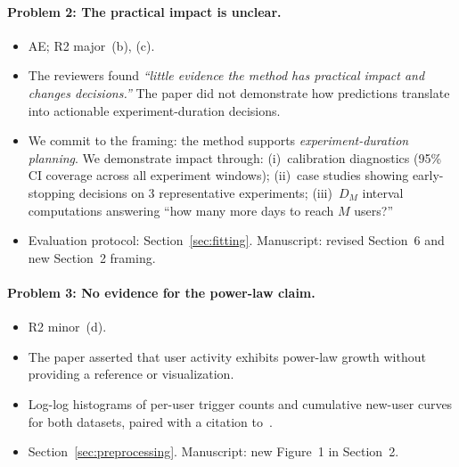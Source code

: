 \paragraph{Problem 2: The practical impact is unclear.}
\begin{itemize}[leftmargin=*]
  \item[\emph{Source:}] AE; R2 major~(b), (c).
  \item[\emph{Problem:}]
        The reviewers found \emph{``little evidence the method has
        practical impact and changes decisions.''}
        The paper did not demonstrate how predictions translate into
        actionable experiment-duration decisions.
  \item[\emph{Solution:}]
        We commit to the framing: the method supports
        \emph{experiment-duration planning}.
        We demonstrate impact through:
        (i)~calibration diagnostics (95\% CI coverage across all
        experiment windows);
        (ii)~case studies showing early-stopping decisions on 3
        representative experiments;
        (iii)~$D_M$ interval computations answering ``how many more
        days to reach $M$ users?''
  \item[\emph{Where:}]
        Evaluation protocol: Section~\ref{sec:fitting}.
        Manuscript: revised Section~6 and new Section~2 framing.
\end{itemize}

\paragraph{Problem 3: No evidence for the power-law claim.}
\begin{itemize}[leftmargin=*]
  \item[\emph{Source:}] R2 minor~(d).
  \item[\emph{Problem:}]
        The paper asserted that user activity exhibits power-law
        growth without providing a reference or visualization.
  \item[\emph{Solution:}]
        Log-log histograms of per-user trigger counts and cumulative
        new-user curves for both datasets, paired with a citation
        to~\citet{clauset2009power}.
  \item[\emph{Where:}]
        Section~\ref{sec:preprocessing}.
        Manuscript: new Figure~1 in Section~2.
\end{itemize}

